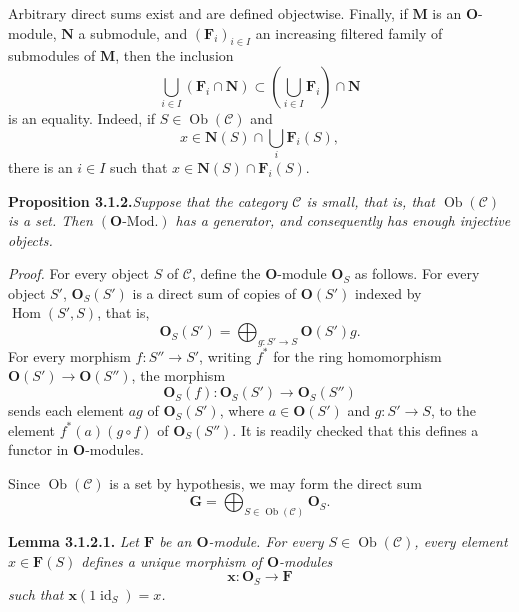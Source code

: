 Arbitrary direct sums exist and are defined objectwise. Finally, if
\(\mathbf M\) is an \(\mathbf O\)-module, \(\mathbf N\) a submodule, and
\((\mathbf F_i)_{i\in I}\) an increasing filtered family of submodules of
\(\mathbf M\), then the inclusion
\[
  \bigcup_{i\in I}(\mathbf F_i\cap\mathbf N)
    \subset
  \left(\bigcup_{i\in I}\mathbf F_i\right)\cap\mathbf N
\]
is an equality. Indeed, if \(S\in\operatorname{Ob}(\mathscr C)\) and
\[
  x\in\mathbf N(S)\cap\bigcup_i\mathbf F_i(S),
\]
there is an \(i\in I\) such that
\(x\in\mathbf N(S)\cap\mathbf F_i(S)\).

\medskip
\noindent\textbf{Proposition 3.1.2.}\footnotemark[\value{footnote}]
\textit{Suppose that the category \(\mathscr C\) is small, that is, that
\(\operatorname{Ob}(\mathscr C)\) is a set. Then
\((\mathbf O\text{-Mod.})\) has a generator, and consequently has enough
injective objects.}

\textit{Proof.}
For every object \(S\) of \(\mathscr C\), define the
\(\mathbf O\)-module \(\mathbf O_S\) as follows. For every object \(S'\),
\(\mathbf O_S(S')\) is a direct sum of copies of \(\mathbf O(S')\) indexed
by \(\operatorname{Hom}(S',S)\), that is,
\[
  \mathbf O_S(S')
    =\bigoplus_{g:S'\to S}\mathbf O(S')g.
\]
For every morphism \(f:S''\to S'\), writing \(f^*\) for the ring
homomorphism \(\mathbf O(S')\to\mathbf O(S'')\), the morphism
\[
  \mathbf O_S(f):\mathbf O_S(S')\longrightarrow\mathbf O_S(S'')
\]
sends each element \(ag\) of \(\mathbf O_S(S')\), where
\(a\in\mathbf O(S')\) and \(g:S'\to S\), to the element
\(f^*(a)(g\circ f)\) of \(\mathbf O_S(S'')\). It is readily checked that
this defines a functor in \(\mathbf O\)-modules.

Since \(\operatorname{Ob}(\mathscr C)\) is a set by hypothesis, we may form
the direct sum
\[
  \mathbf G=\bigoplus_{S\in\operatorname{Ob}(\mathscr C)}\mathbf O_S.
\]

\medskip
\noindent\textbf{Lemma 3.1.2.1.}
\textit{Let \(\mathbf F\) be an \(\mathbf O\)-module. For every
\(S\in\operatorname{Ob}(\mathscr C)\), every element
\(x\in\mathbf F(S)\) defines a unique morphism of \(\mathbf O\)-modules
\[
  \mathbf x:\mathbf O_S\longrightarrow\mathbf F
\]
such that \(\mathbf x(1\operatorname{id}_S)=x\).}

